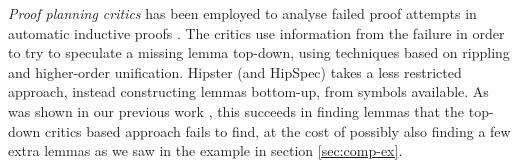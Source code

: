 \emph{Proof planning critics} has been employed to analyse failed proof attempts in automatic inductive proofs \cite{productiveuse}. The critics use information from the failure in order to try to speculate a missing lemma top-down, using techniques based on rippling and higher-order unification. Hipster (and HipSpec) takes a less restricted approach, instead constructing lemmas bottom-up, from symbols available. As was shown in our previous work \cite{hipspecCADE}, this succeeds in finding lemmas that the top-down critics based approach fails to find, at the cost of possibly also finding a few extra lemmas as we saw in the example in section \ref{sec:comp-ex}.   




